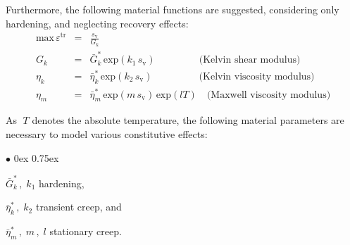 Furthermore, the following material functions are suggested, considering only hardening, and neglecting recovery effects:
\begin{eqnarray}
\mathrm{max}\,\varepsilon^{\mathrm{tr}} & \!\!\!\!= &
\!\!\!\!\frac{s_{\mathrm{v}}}{G_k}
\\[2.0ex]
G_k & \!\!\!\!= &
\!\!\!\!{\bar G}^{\ast}_k\,\mathrm{exp}
\left(
k_1\,s_{\mathrm{v}}
\right)\;\,\qquad\qquad\mbox{(Kelvin shear modulus)}
\label{Mc_lubby2_f2}
\\[2.0ex]
\eta_k & \!\!\!\!= & \!\!\!\!{\bar\eta}^{\ast}_k\,\mathrm{exp}
\left(
k_2\,s_{\mathrm{v}}
\right)\;\;\,\qquad\qquad\mbox{(Kelvin viscosity modulus)}
\label{Mc_lubby2_f3}
\\[2.0ex]
\eta_m & \!\!\!\!= & \!\!\!\!{\bar\eta}^{\ast}_m\,\mathrm{exp}
\left(
m\,s_{\mathrm{v}}
\right)\,\mathrm{exp}(lT)\quad\mbox{(Maxwell viscosity modulus)}
\label{Mc_lubby2_f4}
\end{eqnarray}

As $\;T$ denotes the absolute temperature, the following material
parameters are necessary to model various constitutive effects:
\begin{list}{$\bullet$}{  
   \parsep0ex \itemsep0.75ex}
\item ${\bar G}^{\ast}_k\,,\;k_1$ \hspace*{3.0ex} hardening,
\item ${\bar\eta}^{\ast}_k\,,\;k_2$ \hspace*{4.0ex} transient creep, and
\item ${\bar\eta}^{\ast}_m\,,\;m\,,\;l$ \hspace*{1.0ex} stationary creep.
\end{list}
